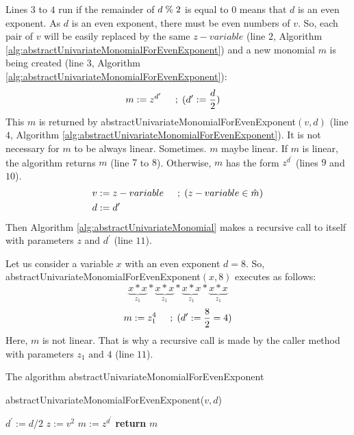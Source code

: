 \noindent Lines $3$ to $4$ run if the remainder of $d \hspace{1mm}\%\hspace{1mm} 2$ is equal to $0$ means that $d$ is an even exponent.
As $d$ is an even exponent, there must be even numbers of $v$.
So, each pair of $v$ will be easily replaced by the same $z-variable$ (line $2$, Algorithm \ref{alg:abstractUnivariateMonomialForEvenExponent}) and a new monomial $m$ is being created (line $3$, Algorithm \ref{alg:abstractUnivariateMonomialForEvenExponent}):
\begin{align}
    m &:= z^{d^{\prime}} \hspace{5mm} ;\hspace{1mm}(d^\prime := \frac{d}{2}) \label{eqn:mPrime}
\end{align}
This $m$ is returned by abstractUnivariateMonomialForEvenExponent$(v, d)$ (line $4$, Algorithm \ref{alg:abstractUnivariateMonomialForEvenExponent}).
It is not necessary for $m$ to be always linear.
Sometimes. $m$ maybe linear.
If $m$ is linear, the algorithm returns $m$ (line $7$ to $8$).
Otherwise, $m$ has the form $z^{d^{\prime}}$ (lines $9$ and $10$).
\begin{align}
    v &:= z-variable \hspace{5mm} ;\hspace{1mm}(z-variable \in \hat{m}) \label{eqn:v} \\
    d &:= d^\prime \label{eqn:d}
\end{align}
Then Algorithm \ref{alg:abstractUnivariateMonomial} makes a recursive call to itself with parameters $z$ and $d^\prime$ (line $11$).\newline

\begin{example}
\label{example:even}
Let us consider a variable $x$ with an even exponent $d = 8$.
So, abstractUnivariateMonomialForEvenExponent$(x, 8)$ executes as follows:
	$$\underbrace{ x \ast x }\limits_{z_{1}} \ast \underbrace{ x \ast x }\limits_{z_{1}} \ast \underbrace{ x \ast x }\limits_{z_{1}} \ast \underbrace{ x \ast x }\limits_{z_{1}}$$
	$$m := z_{1}^4 \hspace{5mm} ;\hspace{1mm}(d^\prime := \frac{8}{2} = 4)$$
	Here, $m$ is not linear. 
	That is why a recursive call is made by the caller method with parameters $z_{1} \text{ and } 4$ (line $11$).
\end{example}

\begin{algorithm}
\caption{The algorithm abstractUnivariateMonomialForEvenExponent} 
\label{alg:abstractUnivariateMonomialForEvenExponent}
abstractUnivariateMonomialForEvenExponent($v, d$)
\begin{algorithmic}[1]
\State $d^\prime := d/2$
\State $z:= v^2$
\State $m := z^{d^\prime}$
\State \textbf{return} $m$
\end{algorithmic}
\end{algorithm}

